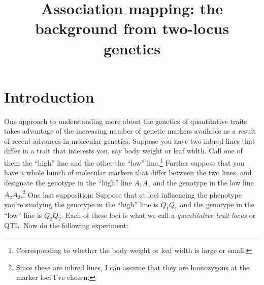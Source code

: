 \documentclass[12pt]{article}
\title{Association mapping: the background from two-locus genetics}
\begin{document}
\maketitle

\thispagestyle{first}

\section*{Introduction}

One approach to understanding more about the genetics of quantitative
traits takes advantage of the increasing number of genetic markers
available as a result of recent advances in molecular
genetics. Suppose you have two inbred lines that differ in a trait
that interests you, say body weight or leaf width. Call one of them
the ``high'' line and the other the ``low''
line.\footnote{Corresponding to whether the body weight or leaf width
  is large or small.} Further suppose that you have a whole bunch of
molecular markers that differ between the two lines, and designate the
genotype in the ``high'' line $A_1A_1$ and the genotype in the low
line $A_2A_2$.\footnote{Since these are inbred lines, I can assume
  that they are homozygous at the marker loci I've chosen.} One last
supposition: Suppose that at loci influencing the phenotype you're
studying the genotype in the ``high'' line is $Q_1Q_1$ and the
genotype in the ``low'' line is $Q_2Q_2$. Each of these loci is what
we call a {\it quantitative trait locus\/} or QTL. Now do the following experiment:
\end{document}
